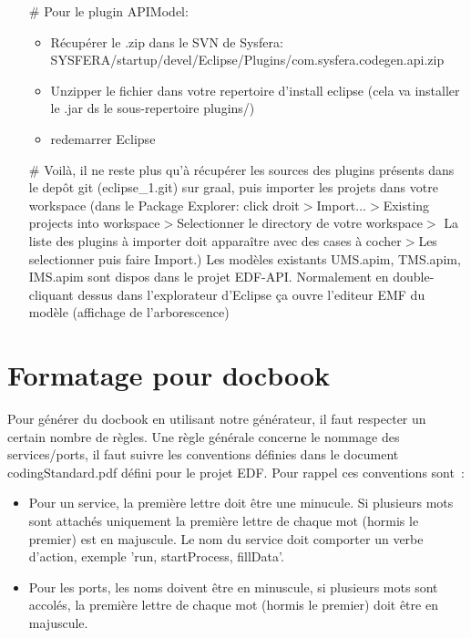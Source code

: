 \documentclass{article}
\begin{document}
\begin{itemize}
\begin{itemize}
  \item[\#] Pour le plugin APIModel:
    \begin{itemize}
      \item R\'ecup\'erer le .zip dans le SVN de Sysfera: SYSFERA/startup/devel/Eclipse\-/Plugins/com.sysfera.codegen.api.zip
      \item Unzipper le fichier dans votre repertoire d'install eclipse (cela va installer le .jar ds le sous-repertoire plugins/)
      \item redemarrer Eclipse
    \end{itemize}
  \item[\#] Voil\`a, il ne reste plus qu'\`a r\'ecup\'erer les sources des plugins présents dans le depôt git (eclipse\_1.git) sur graal, puis importer les projets dans votre workspace (dans le Package Explorer: click droit$>$Import...$>$Existing projects into workspace$>$Selectionner le directory de votre workspace$>$ La liste des plugins \`a importer doit appara\^itre avec des cases à cocher$>$Les selectionner puis faire Import.) Les mod\`eles existants UMS.apim, TMS.apim, IMS.apim sont dispos dans le projet EDF-API. Normalement en double-cliquant dessus dans l'explorateur d'Eclipse ça ouvre l'editeur EMF du modèle (affichage de l'arborescence)
  \end{itemize}
\end{itemize}

\section*{Formatage pour docbook}
Pour g\'en\'erer du docbook en utilisant notre g\'en\'erateur, il faut respecter un certain nombre de r\`egles. 
Une r\`egle g\'en\'erale concerne le nommage des services/ports, il faut suivre les conventions d\'efinies dans le document codingStandard.pdf d\'efini pour le projet EDF. Pour rappel ces conventions sont~:
\begin{itemize}
\item Pour un service, la premi\`ere lettre doit \^etre une minucule. Si plusieurs mots sont attach\'es uniquement la premi\`ere lettre de chaque mot (hormis le premier) est en majuscule. Le nom du service doit comporter un verbe d'action, exemple 'run, startProcess, fillData'.
\item Pour les ports, les noms doivent \^etre en minuscule, si plusieurs mots sont accol\'es, la premi\`ere lettre de chaque mot (hormis le premier) doit \^etre en majuscule.
\end{itemize}
\end{document}
